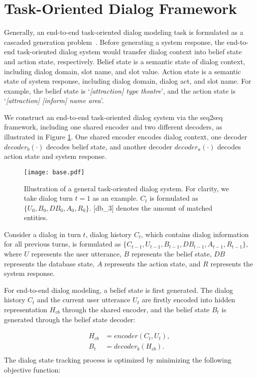 \section{Task-Oriented Dialog Framework}
\label{sec:third}

Generally, an end-to-end task-oriented dialog modeling task is formulated as a cascaded generation problem~\cite{DBLP:journals/corr/abs-2109-14739}. Before generating a system response, the end-to-end task-oriented dialog system would transfer dialog  context into belief state and action state, respectively.
Belief state is  a semantic state of dialog context, including dialog domain, slot name, and slot value. 
Action state is a  semantic state of system response, including dialog domain, dialog act, and slot name.  For example, the belief state is `\textit{[attraction] type theatre}', and the action state is `\textit{[attraction] [inform] name area}'.%

We construct an end-to-end task-oriented dialog  system  via the seq2seq framework, including one shared encoder and two different decoders,
as illustrated in Figure \ref{fig:baseline}.
One shared encoder encodes dialog context, one decoder $decoder_b(\cdot)$ decodes belief state, and  another decoder $decoder_a(\cdot)$ decodes action state and system response.
\begin{figure}[t]
  \centering
  \texttt{[image: base.pdf]}
  \caption{Illustration of a general  task-oriented dialog system. For clarity, we take dialog turn $t=1$ as an example. $C_t$ is formulated as $\{U_0,B_0,DB_0,A_0,R_0\}$. [db\_3] denotes the amount of matched entities.}
  \label{fig:baseline}
\end{figure}
Consider a dialog in turn $t$, dialog history $C_t$, which contains  dialog information for all previous turns, is formulated as $\{C_{t-1},U_{t-1},B_{t-1},DB_{t-1},A_{t-1},R_{t-1}\}$, where $U$ represents  the  user utterance, $B$ represents  the belief state, $DB$ represents  the database state, $A$ represents  the action state, and $R$ represents  the system response.

For end-to-end dialog modeling, a belief state is first generated. 
The dialog history $C_t$ and the  current user utterance $U_t$ are firstly encoded into hidden representation $H_{cb}$ through the shared encoder, and the belief state $B_t$ is generated through the belief state decoder:

{\footnotesize
\setlength{\abovedisplayskip}{0.005cm}
\setlength{\belowdisplayskip}{0.005cm}
\begin{equation}
\begin{aligned}
H_{cb} &= encoder(C_{t},U_t),\\
B_t &= decoder_b(H_{cb}).\\
\end{aligned}
\end{equation}}%
The dialog state tracking process is optimized by minimizing the following objective function:

